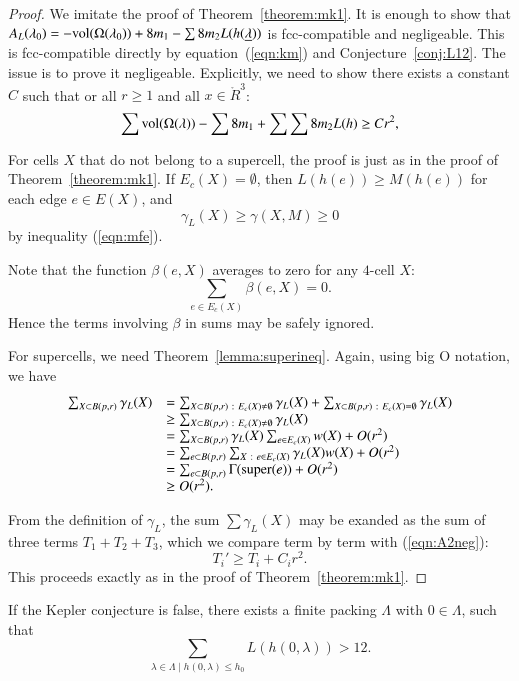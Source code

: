 \begin{proof}  We imitate the proof of Theorem~\ref{theorem:mk1}.
It is enough to show that $A_L(\lambda_0)  = -{\operatorname{vol}}(\Omega(\lambda_0)) + 8 m_1 - \sum 8 m_2 L(h({\underline{\lambda}}))$ is fcc-compatible and negligeable. 
This is fcc-compatible directly
by equation~(\ref{eqn:km})
and Conjecture~\ref{conj:L12}.  The issue is to prove it negligeable.  Explicitly, we need
to show there exists a constant  $C$ such that or all $r\ge 1$ and all $x\in\ring{R}^3$:
\begin{equation}\label{eqn:A2neg}
  \sum {\operatorname{vol}}(\Omega(\lambda)) -\sum 8m_1 + \sum \sum 8 m_2 L(h) \ge C r^2,
\end{equation}

For cells $X$ that do not belong to a supercell,
the proof is just as in the proof of Theorem~\ref{theorem:mk1}.
If $E_c(X)=\emptyset$, then 
$L(h(e))\ge M(h(e))$ for each edge $e\in E(X)$, and
$$\gamma_L(X)\ge \gamma(X,M)\ge 0$$ 
by inequality (\ref{eqn:mfe}).

Note that the function $\beta(e,X)$ averages to zero for any $4$-cell $X$:
$$
\sum_{e\in E_c(X)} \beta(e,X) = 0.
$$
Hence the terms involving $\beta$ in sums may be safely ignored.

For supercells, we need Theorem~\ref{lemma:superineq}.
Again, using big O notation, we have
$$
\begin{array}{lll}
\sum_{X\subset B(p,r)} \gamma_L(X) &= 
\sum_{X\subset B(p,r)\ :\  E_c(X)\ne\emptyset} \gamma_L(X) +
\sum_{X\subset B(p,r)\ :\  E_c(X)=\emptyset} \gamma_L(X) \\
&\ge \sum_{X\subset B(p,r)\ :\  E_c(X)\ne\emptyset} \gamma_L(X) \\
&=\sum_{X\subset B(p,r)}\gamma_L(X)\sum_{e \in E_c(X)}w(X) + O(r^2)\\
&=\sum_{e\subset B(p,r)}\sum_{X\ :\  e \in E_c(X)}\gamma_L(X)w(X) + O(r^2)\\
&=\sum_{e\subset B(p,r)}\Gamma({\operatorname{super}}(e)) + O(r^2)\\
&\ge O(r^2).
\end{array}
$$

From the definition of $\gamma_L$, the sum $\sum \gamma_L(X)$ may be exanded as the sum of three terms $T_1+T_2+T_3$, which we compare term by term with (\ref{eqn:A2neg}):
$$
T_i' \ge T_i + C_i r^2.
$$
This proceeds exactly as in the proof of Theorem~\ref{theorem:mk1}.
\end{proof}

\begin{corollary}\label{cor:CE} If the Kepler conjecture is false,
there exists a finite packing $\Lambda$ with $0\in\Lambda$, such
that
\begin{equation}\label{eqn:CE}
\sum_{\lambda\in\Lambda \mid h(0,\lambda)\le h_0} L(h(0,\lambda)) > 12.
\end{equation}
\end{corollary}

